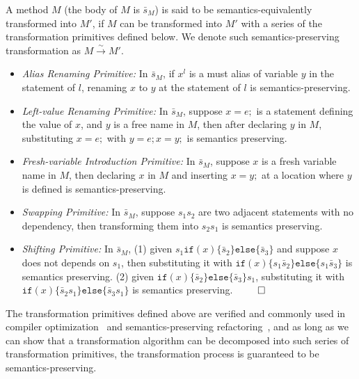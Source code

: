 \documentclass[letterpaper, USenglish]{lipics-v2016}
\theoremstyle{plain}
\begin{document}
\begin{definition}
\label{def:semantics-preserving}
A method $M$ (the body of $M$ is $\bar{s}_M$) is said to be semantics-equivalently transformed into $M'$, if $M$ can be transformed into $M'$ with a series of the transformation primitives defined below. We denote such semantics-preserving transformation as $M\xrightarrow{\sim}M'$.
\begin{itemize}
\item \textit{Alias Renaming Primitive:} In $\bar{s}_M$, if $x^l$ is a must alias of variable $y$ in the statement of $l$,
  renaming $x$ to $y$ at the statement of $l$ is semantics-preserving.
\item \textit{Left-value Renaming Primitive:} In $\bar{s}_M$, suppose $x=e;$ is a statement defining the value of $x$, and $y$ is a free name in $M$, then after declaring $y$ in $M$, substituting $x=e;$ with $y=e; x=y;$ is semantics preserving.
\item \textit{Fresh-variable Introduction Primitive:} In $\bar{s}_M$, suppose $x$ is a fresh variable name in $M$, then declaring $x$ in $M$ and inserting $x=y;$ at a location where $y$ is defined is semantics-preserving.
\item \textit{Swapping Primitive:} In $\bar{s}_M$, suppose $s_1s_2$
  are two adjacent statements with no dependency, then transforming them into $s_2s_1$ is semantics preserving.
\item \textit{Shifting Primitive:} In $\bar{s}_M$, (1) given $s_1\mathtt{if}(x)\{\bar{s}_2\}\mathtt{else}\{\bar{s}_3\}$ and suppose $x$ does not depends on $s_1$, then substituting it with $\mathtt{if}(x)\{s_1\bar{s}_2\}\mathtt{else}\{s_1\bar{s}_3\}$ is semantics preserving.  (2) given $\mathtt{if}(x)\{\bar{s}_2\}\mathtt{else}\{\bar{s}_3\}s_1$, substituting it with $\mathtt{if}(x)\{\bar{s}_2s_1\}\mathtt{else}\{\bar{s}_3s_1\}$ is semantics preserving.~\hfill $\qed$
\end{itemize}
\end{definition}

The transformation primitives defined above are verified and commonly used in compiler optimization~\cite{Wegman:1991:CPC:103135.103136,Aho:2006:CPT:1177220,Callahan:1986:ICP:12276.13327,DBLP:conf/sefm/KanadeSK06} and semantics-preserving refactoring~\cite{Schafer:2008:SER:1449764.1449787,Opdyke:1992:ROF:169783,Roberts:1999:PAR:929806}, and as long as we can show that a transformation algorithm can be decomposed into such series of transformation primitives, the transformation process is guaranteed to be semantics-preserving.
\end{document}
